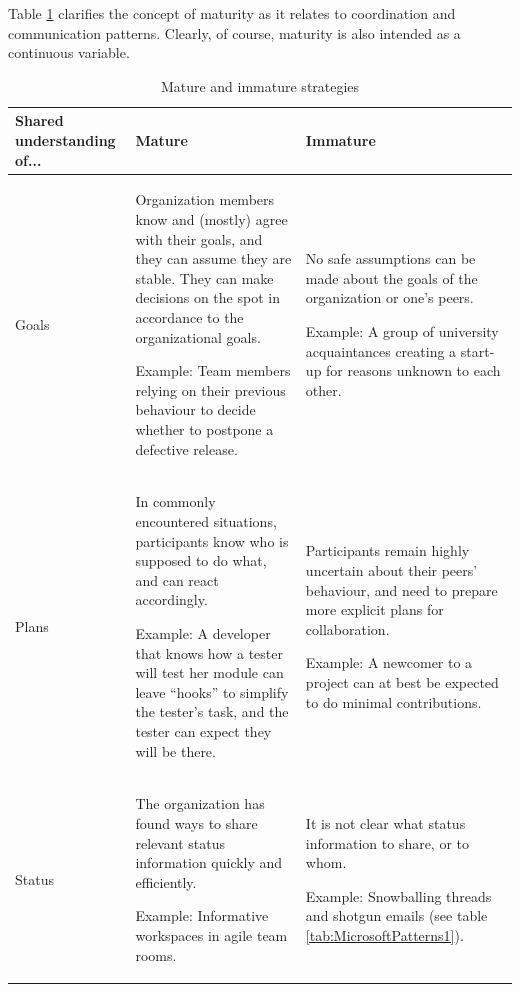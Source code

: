 Table \ref{tab:Maturity} clarifies the concept of maturity as it relates to coordination and communication patterns. Clearly, of course, maturity is also intended as a continuous variable.

\begin{table}[tbp]
\caption{\label{tab:Maturity} Mature and immature strategies}
\centering
\footnotesize{\begin{tabular}{p{2.0cm}p{5.8cm}p{5.8cm}}
\hline \hline
\vspace{1pt} \bfseries Shared understanding of... & \vspace{1pt} \bfseries Mature & \vspace{1pt} \bfseries Immature \\
\hline
\vspace{0.5pt} Goals & \vspace{0.5pt} Organization members know and (mostly) agree with their goals, and they can assume they are stable. They can make decisions on the spot in accordance to the organizational goals. \par Example: Team members relying on their previous behaviour to decide whether to postpone a defective release. & \vspace{0.5pt} No safe assumptions can be made about the goals of the organization or one's peers. \par Example: A group of university acquaintances creating a start-up for reasons unknown to each other. \\
\hline
\vspace{0.5pt} Plans & \vspace{0.5pt} In commonly encountered situations, participants know who is supposed to do what, and can react accordingly. \par Example: A developer that knows how a tester will test her module can leave ``hooks'' to simplify the tester's task, and the tester can expect they will be there. & \vspace{0.5pt} Participants remain highly uncertain about their peers' behaviour, and need to prepare more explicit plans for collaboration. \par Example: A newcomer to a project can at best be expected to do minimal contributions.\\
\hline
\vspace{0.5pt} Status & \vspace{0.5pt} The organization has found ways to share relevant status information quickly and efficiently. \par Example: Informative workspaces in agile team rooms. & \vspace{0.5pt} It is not clear what status information to share, or to whom. \par Example: Snowballing threads and shotgun emails (see table \ref{tab:MicrosoftPatterns1}).\\

\end{tabular}}
\end{table}
